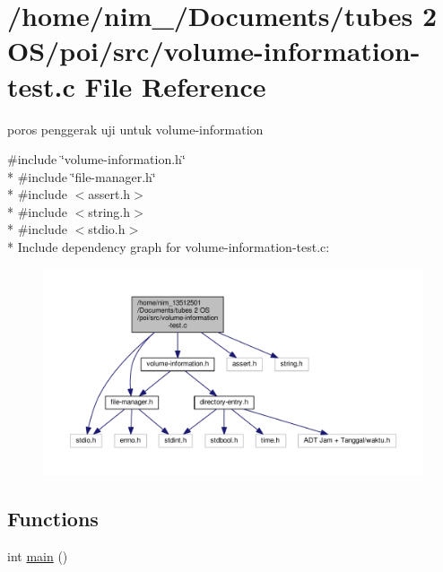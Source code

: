 \hypertarget{volume-information-test_8c}{\section{/home/nim\-\_/\-Documents/tubes 2 O\-S/poi/src/volume-\/information-\/test.c File Reference}
\label{volume-information-test_8c}
}


poros penggerak uji untuk volume-\/information  


{\ttfamily \#include \char`\"{}volume-\/information.\-h\char`\"{}}\\*
{\ttfamily \#include \char`\"{}file-\/manager.\-h\char`\"{}}\\*
{\ttfamily \#include $<$assert.\-h$>$}\\*
{\ttfamily \#include $<$string.\-h$>$}\\*
{\ttfamily \#include $<$stdio.\-h$>$}\\*
Include dependency graph for volume-\/information-\/test.c\-:\nopagebreak
\begin{figure}[H]
\begin{center}
\leavevmode
\includegraphics[width=350pt]{volume-information-test_8c__incl}
\end{center}
\end{figure}
\subsection*{Functions}
\begin{DoxyCompactItemize}
\item 
int \hyperlink{volume-information-test_8c_ae66f6b31b5ad750f1fe042a706a4e3d4}{main} ()
\end{DoxyCompactItemize}



